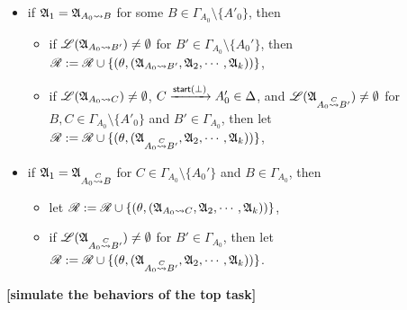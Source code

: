 {\begin{minipage}{\textwidth}
{\begin{enumerate}
\begin{itemize}
      \item if  ${\mathfrak{A} }_1 = {\mathfrak{A} }_{A_0\rightsquigarrow B}$ for some $B \in \Gamma_{A_0} \setminus \{A'_0\}$, then
      \begin{itemize}
      \item if ${\mathscr{L} }({\mathfrak{A} }_{A_0\rightsquigarrow B'}) \neq \emptyset$ for $B' \in \Gamma_{A_0}\setminus\{A_0'\}$, then $\mathscr{R} := \mathscr{R} \cup \{(\theta, ({\mathfrak{A} }_{A_0 \rightsquigarrow B'}, {\mathfrak{A} }_2,\cdots,{\mathfrak{A} }_k))\}$,
      \item if ${\mathscr{L} }({\mathfrak{A} }_{A_0 \rightsquigarrow C}) \neq \emptyset$, $C \xrightarrow[]{{\mathsf{start} }(\bot)} A_0' \in \Delta$, and ${\mathscr{L} }({\mathfrak{A} }_{A_0 \stackrel{C}{\rightsquigarrow} B'}) \neq \emptyset$ for $B, C \in \Gamma_{A_0} \setminus \{A'_0\}$ and $B' \in \Gamma_{A_0}$, then let $\mathscr{R} := \mathscr{R} \cup \{(\theta, ({\mathfrak{A} }_{A_0\stackrel{C}\rightsquigarrow B'}, {\mathfrak{A} }_2,\cdots,{\mathfrak{A} }_k))\}$,
      \end{itemize}
        \item if ${\mathfrak{A} }_1 = {\mathfrak{A} }_{A_0\stackrel{C}\rightsquigarrow B}$ for $C \in\Gamma_{A_0}\setminus\{A_0'\}$ and $B \in \Gamma_{A_0}$, then 
        \begin{itemize}
        \item let $\mathscr{R} := \mathscr{R} \cup \{(\theta, ({\mathfrak{A} }_{A_0\rightsquigarrow C}, {\mathfrak{A} }_2,\cdots,{\mathfrak{A} }_k))\}$, 
       \item if ${\mathscr{L} }({\mathfrak{A} }_{A_0 \stackrel{C}{\rightsquigarrow} B'}) \neq \emptyset$ for $B' \in \Gamma_{A_0}$, then let $\mathscr{R} := \mathscr{R} \cup \{(\theta, ({\mathfrak{A} }_{A_0\stackrel{C}{\rightsquigarrow} B'}, {\mathfrak{A} }_2,\cdots,{\mathfrak{A} }_k))\}$.
       \end{itemize}
    \end{itemize}
        \textbf{[simulate the behaviors of the top task]}
\end{enumerate}
}
\end{minipage}
}

